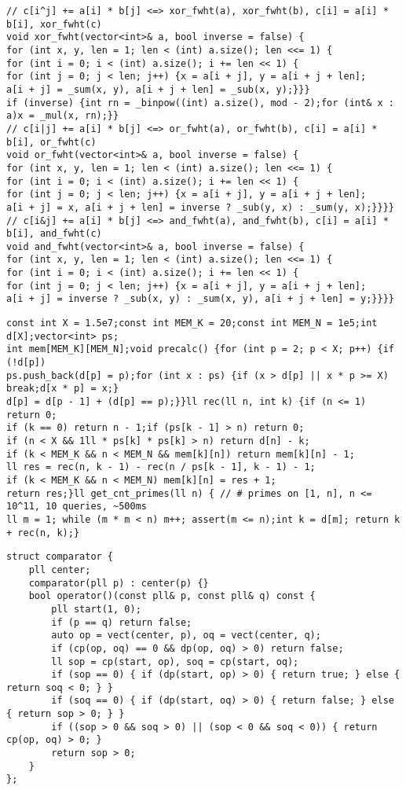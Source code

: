 \documentclass[a4paper,12pt]{article}
\begin{document}
\begin{verbatim}
// c[i^j] += a[i] * b[j] <=> xor_fwht(a), xor_fwht(b), c[i] = a[i] * b[i], xor_fwht(c)
void xor_fwht(vector<int>& a, bool inverse = false) {
for (int x, y, len = 1; len < (int) a.size(); len <<= 1) {
for (int i = 0; i < (int) a.size(); i += len << 1) {
for (int j = 0; j < len; j++) {x = a[i + j], y = a[i + j + len];
a[i + j] = _sum(x, y), a[i + j + len] = _sub(x, y);}}}
if (inverse) {int rn = _binpow((int) a.size(), mod - 2);for (int& x : a)x = _mul(x, rn);}}
// c[i|j] += a[i] * b[j] <=> or_fwht(a), or_fwht(b), c[i] = a[i] * b[i], or_fwht(c)
void or_fwht(vector<int>& a, bool inverse = false) {
for (int x, y, len = 1; len < (int) a.size(); len <<= 1) {
for (int i = 0; i < (int) a.size(); i += len << 1) {
for (int j = 0; j < len; j++) {x = a[i + j], y = a[i + j + len];
a[i + j] = x, a[i + j + len] = inverse ? _sub(y, x) : _sum(y, x);}}}}
// c[i&j] += a[i] * b[j] <=> and_fwht(a), and_fwht(b), c[i] = a[i] * b[i], and_fwht(c)
void and_fwht(vector<int>& a, bool inverse = false) {
for (int x, y, len = 1; len < (int) a.size(); len <<= 1) {
for (int i = 0; i < (int) a.size(); i += len << 1) {
for (int j = 0; j < len; j++) {x = a[i + j], y = a[i + j + len];
a[i + j] = inverse ? _sub(x, y) : _sum(x, y), a[i + j + len] = y;}}}}
\end{verbatim}

\begin{verbatim}
const int X = 1.5e7;const int MEM_K = 20;const int MEM_N = 1e5;int d[X];vector<int> ps;
int mem[MEM_K][MEM_N];void precalc() {for (int p = 2; p < X; p++) {if (!d[p])
ps.push_back(d[p] = p);for (int x : ps) {if (x > d[p] || x * p >= X) break;d[x * p] = x;}
d[p] = d[p - 1] + (d[p] == p);}}ll rec(ll n, int k) {if (n <= 1) return 0;
if (k == 0) return n - 1;if (ps[k - 1] > n) return 0;
if (n < X && 1ll * ps[k] * ps[k] > n) return d[n] - k;
if (k < MEM_K && n < MEM_N && mem[k][n]) return mem[k][n] - 1;
ll res = rec(n, k - 1) - rec(n / ps[k - 1], k - 1) - 1;
if (k < MEM_K && n < MEM_N) mem[k][n] = res + 1;
return res;}ll get_cnt_primes(ll n) { // # primes on [1, n], n <= 10^11, 10 queries, ~500ms
ll m = 1; while (m * m < n) m++; assert(m <= n);int k = d[m]; return k + rec(n, k);}
\end{verbatim}

\begin{verbatim}
struct comparator {
    pll center;
    comparator(pll p) : center(p) {}
    bool operator()(const pll& p, const pll& q) const {
        pll start(1, 0);
        if (p == q) return false;
        auto op = vect(center, p), oq = vect(center, q);
        if (cp(op, oq) == 0 && dp(op, oq) > 0) return false;
        ll sop = cp(start, op), soq = cp(start, oq);
        if (sop == 0) { if (dp(start, op) > 0) { return true; } else { return soq < 0; } }
        if (soq == 0) { if (dp(start, oq) > 0) { return false; } else { return sop > 0; } }
        if ((sop > 0 && soq > 0) || (sop < 0 && soq < 0)) { return cp(op, oq) > 0; }
        return sop > 0;
    }
};
\end{verbatim}
\end{document}
